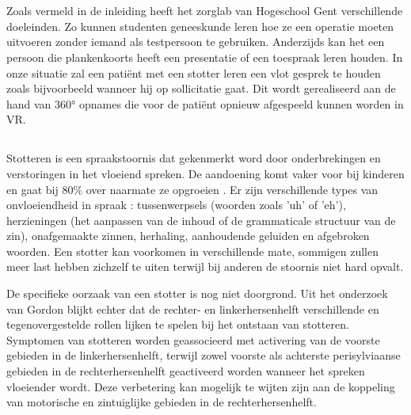 \chapter{} \label{chap:State of the art}%
\label{ch:stand-van-zaken}



Zoals vermeld in de inleiding heeft het zorglab van Hogeschool Gent verschillende doeleinden. Zo kunnen studenten geneeskunde leren hoe ze een operatie moeten uitvoeren zonder iemand als testpersoon te gebruiken. Anderzijds kan het een persoon die plankenkoorts heeft een presentatie of een toespraak leren houden. In onze situatie zal een patiënt met een stotter leren een vlot gesprek te houden zoals bijvoorbeeld wanneer hij op sollicitatie gaat. Dit wordt gerealiseerd aan de hand van 360° opnames die voor de patiënt opnieuw afgespeeld kunnen worden in VR.

\section{}%
Stotteren is een spraakstoornis dat gekenmerkt word door onderbrekingen en verstoringen in het vloeiend spreken. De aandoening komt vaker voor bij kinderen en gaat bij 80\% over naarmate ze opgroeien \autocite{Gordon2002}. Er zijn verschillende types van onvloeiendheid in spraak \autocite{Chee2009}: tussenwerpsels (woorden zoals 'uh' of 'eh'), herzieningen (het aanpassen van de inhoud of de grammaticale structuur van de zin), onafgemaakte zinnen, herhaling, aanhoudende geluiden en afgebroken woorden. Een stotter kan voorkomen in verschillende mate, sommigen zullen meer last hebben zichzelf te uiten terwijl bij anderen de stoornis niet hard opvalt.

De specifieke oorzaak van een stotter is nog niet doorgrond. Uit het onderzoek van Gordon blijkt echter dat de rechter- en linkerhersenhelft verschillende en tegenovergestelde rollen lijken te spelen bij het ontstaan van stotteren. Symptomen van stotteren worden geassocieerd met activering van de voorste gebieden in de linkerhersenhelft, terwijl zowel voorste als achterste perisylviaanse gebieden in de rechterhersenhelft geactiveerd worden wanneer het spreken vloeiender wordt. Deze verbetering kan mogelijk te wijten zijn aan de koppeling van motorische en zintuiglijke gebieden in de rechterhersenhelft.

